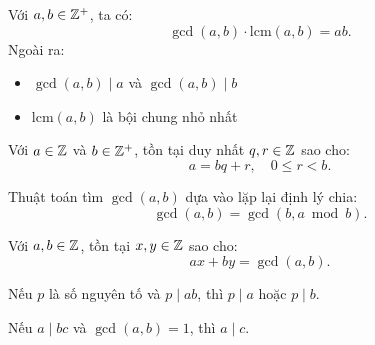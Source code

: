 \documentclass[../imo-training-open-book.tex]{subfiles}
\begin{document}
\vspace{1em}

\begin{theorem}
    \label{theorem:gcd-lcm-properties}
    Với \( a, b \in \mathbb Z^+ \), ta có:
    \[
        \gcd(a, b) \cdot \mathrm{lcm}(a, b) = ab.
    \]
    Ngoài ra:
    \begin{itemize}[topsep=0pt, itemsep=0pt]
        \item \( \gcd(a, b) \mid a \) và \( \gcd(a, b) \mid b \)
        \item \( \mathrm{lcm}(a, b) \) là bội chung nhỏ nhất
    \end{itemize}
\end{theorem}

\vspace{1em}

\begin{theorem}
    \label{theorem:euclidean-division}
    Với \( a \in \mathbb Z \) và \( b \in \mathbb Z^+ \), tồn tại duy nhất \( q, r \in \mathbb Z \) sao cho:
    \[
        a = bq + r,\quad 0 \le r < b.
    \]
\end{theorem}

\vspace{1em}

\begin{theorem}
    \label{theorem:euclidean-algorithm}
    Thuật toán tìm \( \gcd(a, b) \) dựa vào lặp lại định lý chia:
    \[
        \gcd(a, b) = \gcd(b, a \bmod b).
    \]
\end{theorem}

\vspace{1em}

\begin{theorem}
    \label{theorem:bezout}
    Với \( a, b \in \mathbb Z \), tồn tại \( x, y \in \mathbb Z \) sao cho:
    \[
        ax + by = \gcd(a, b).
    \]
\end{theorem}

\vspace{1em}

\begin{theorem}
    \label{theorem:prime-divides-product}
    Nếu \( p \) là số nguyên tố và \( p \mid ab \), thì \( p \mid a \) hoặc \( p \mid b \).
\end{theorem}

\begin{theorem*}
    \label{theorem:coprime-divides-product}
	Nếu \( a \mid bc \) và \( \gcd(a, b) = 1 \), thì \( a \mid c \).
\end{theorem*}
\end{document}
